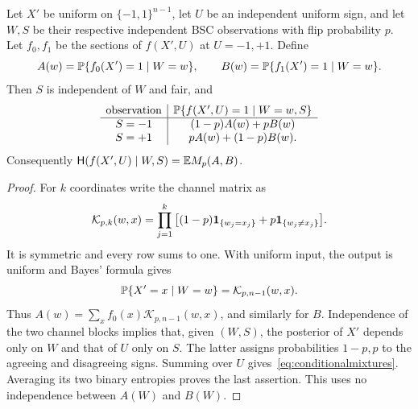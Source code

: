 \begin{lemma}\label{lem:posterioridentity}
Let $X'$ be uniform on $\{-1,1\}^{n-1}$, let $U$ be an independent uniform sign, and let $W,S$ be their respective independent BSC observations with flip probability $p$. Let $f_0,f_1$ be the sections of $f(X',U)$ at $U=-1,+1$. Define
\[
A(w)=\mathbb P\{f_0(X')=1\mid W=w\},\qquad
B(w)=\mathbb P\{f_1(X')=1\mid W=w\}.
\]
Then $S$ is independent of $W$ and fair, and
\begin{equation}\label{eq:conditionalmixtures}
\begin{array}{c|c}
\text{observation}&\mathbb P\{f(X',U)=1\mid W=w,S\}\\ \hline
S=-1&(1-p)A(w)+pB(w)\\
S=+1&pA(w)+(1-p)B(w).
\end{array}
\end{equation}
Consequently $\mathsf H(f(X',U)\mid W,S)=\mathbb E M_p(A,B)$.
\end{lemma}
\begin{proof}
For $k$ coordinates write the channel matrix as
\[
\mathcal K_{p,k}(w,x)=\prod_{j=1}^k\big[(1-p)\mathbf 1_{\{w_j=x_j\}}+p\mathbf 1_{\{w_j\ne x_j\}}\big].
\]
It is symmetric and every row sums to one. With uniform input, the output is uniform and Bayes' formula gives
\[
\mathbb P\{X'=x\mid W=w\}=\mathcal K_{p,n-1}(w,x).
\]
Thus $A(w)=\sum_x f_0(x)\mathcal K_{p,n-1}(w,x)$, and similarly for $B$. Independence of the two channel blocks implies that, given $(W,S)$, the posterior of $X'$ depends only on $W$ and that of $U$ only on $S$. The latter assigns probabilities $1-p,p$ to the agreeing and disagreeing signs. Summing over $U$ gives~\eqref{eq:conditionalmixtures}. Averaging its two binary entropies proves the last assertion. This uses no independence between $A(W)$ and $B(W)$.
\end{proof}


